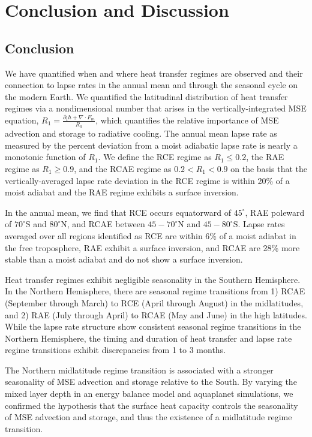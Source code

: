 \documentclass{ametsocV5}
\begin{document}
\section{Conclusion and Discussion}

\subsection{Conclusion}
We have quantified when and where heat transfer regimes are observed and their connection to lapse rates in the annual mean and through the seasonal cycle on the modern Earth. We quantified the latitudinal distribution of heat transfer regimes via a nondimensional number that arises in the vertically-integrated MSE equation, $R_1=\frac{\partial_t h + \nabla\cdot F_m}{R_a}$, which quantifies the relative importance of MSE advection and storage to radiative cooling. The annual mean lapse rate as measured by the percent deviation from a moist adiabatic lapse rate is nearly a monotonic function of $R_1$. We define the RCE regime as $R_1 \le 0.2$, the RAE regime as $R_1 \ge 0.9$, and the RCAE regime as $0.2 < R_1 < 0.9$ on the basis that the vertically-averaged lapse rate deviation in the RCE regime is within 20\% of a moist adiabat and the RAE regime exhibits a surface inversion.

In the annual mean, we find that RCE occurs equatorward of $45^\circ$, RAE poleward of $70^\circ$S and $80^\circ$N, and RCAE between $45-70^\circ$N and $45-80^\circ$S. Lapse rates averaged over all regions identified as RCE are within 6\% of a moist adiabat in the free troposphere, RAE exhibit a surface inversion, and RCAE are 28\% more stable than a moist adiabat and do not show a surface inversion.

Heat transfer regimes exhibit negligible seasonality in the Southern Hemisphere. In the Northern Hemisphere, there are seasonal regime transitions from 1) RCAE (September through March) to RCE (April through August) in the midlatitudes, and 2) RAE (July through April) to RCAE (May and June) in the high latitudes. While the lapse rate structure show consistent seasonal regime transitions in the Northern Hemisphere, the timing and duration of heat transfer and lapse rate regime transitions exhibit discrepancies from 1 to 3 months.

The Northern midlatitude regime transition is associated with a stronger seasonality of MSE advection and storage relative to the South. By varying the mixed layer depth in an energy balance model and aquaplanet simulations, we confirmed the hypothesis that the surface heat capacity controls the seasonality of MSE advection and storage, and thus the existence of a midlatitude regime transition.
\end{document}
